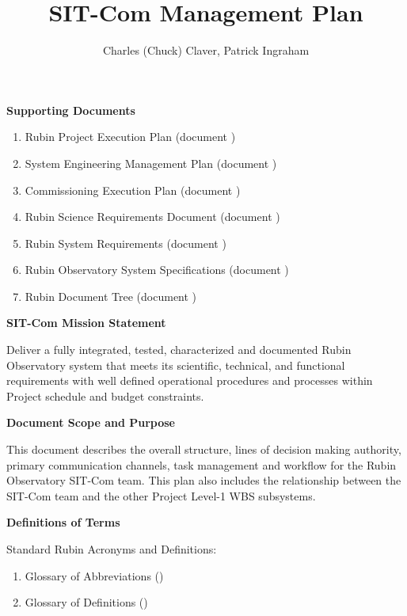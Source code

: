 \documentclass[SE,lsstdraft,authoryear,toc]{lsstdoc}
\title{SIT-Com Management Plan}
\author{%
Charles (Chuck) Claver, Patrick Ingraham
}
\date{\vcsDate}
\begin{document}
\maketitle


\textbf{Supporting Documents}

    \begin{enumerate}
        \item Rubin Project Execution Plan (document )

        \item System Engineering Management Plan (document )

        \item Commissioning Execution Plan (document )

        \item Rubin Science Requirements Document (document )

        \item Rubin System Requirements (document )

        \item Rubin Observatory System Specifications (document )

        \item Rubin Document Tree (document )

    \end{enumerate}

\textbf{SIT-Com Mission Statement}
\label{sec:Mission}

Deliver a fully integrated, tested, characterized and documented Rubin Observatory system that meets its scientific, technical, and functional requirements with well defined operational procedures and processes within Project schedule and budget constraints.

\textbf{Document Scope and Purpose}
\label{sec:Scope}

This document describes the overall structure, lines of decision making authority, primary communication channels, task management and workflow for the Rubin Observatory SIT-Com team.
This plan also includes the relationship between the SIT-Com team and the other Project Level-1 WBS subsystems.

\textbf{Definitions of Terms}

Standard Rubin Acronyms and Definitions:
\begin{enumerate}
    \item Glossary of Abbreviations ()
    \item Glossary of Definitions ()
\end{enumerate}
\end{document}

